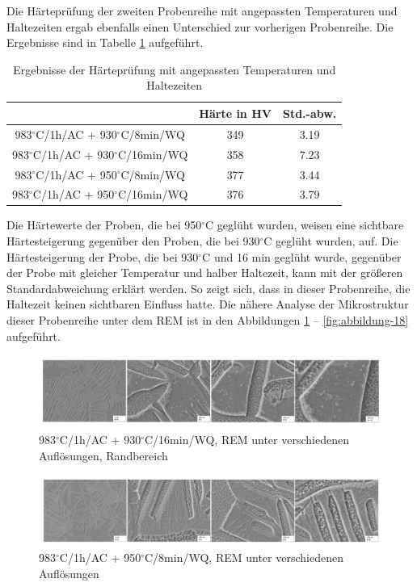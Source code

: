 Die Härteprüfung der zweiten Probenreihe mit angepassten Temperaturen und Haltezeiten ergab ebenfalls einen Unterschied zur vorherigen Probenreihe. Die Ergebnisse sind in Tabelle \ref{Tabelle 7} aufgeführt.

\begin{table}[h]
\centering
\begin{tabular}{|c|c|c|}
\hline 
& Härte in HV &  Std.-abw. \\ 
\hline 
983$^\circ$C/1h/AC + 930$^\circ$C/8min/WQ & 349 & 3.19 \\ 
\hline 
983$^\circ$C/1h/AC + 930$^\circ$C/16min/WQ & 358 & 7.23 \\ 
\hline 
983$^\circ$C/1h/AC + 950$^\circ$C/8min/WQ & 377 & 3.44 \\ 
\hline 
983$^\circ$C/1h/AC + 950$^\circ$C/16min/WQ & 376 & 3.79 \\ 
\hline 
\end{tabular} 
\caption{Ergebnisse der Härteprüfung mit angepassten Temperaturen und Haltezeiten}
\label{Tabelle 7}
\end{table}

Die Härtewerte der Proben, die bei 950$^\circ$C geglüht wurden, weisen eine sichtbare Härtesteigerung gegenüber den Proben, die bei 930$^\circ$C geglüht wurden, auf. Die Härtesteigerung der Probe, die bei 930$^\circ$C und 16 min geglüht wurde, gegenüber der Probe mit gleicher Temperatur und halber Haltezeit, kann mit der größeren Standardabweichung erklärt werden. So zeigt sich, dass in dieser Probenreihe, die Haltezeit keinen sichtbaren Einfluss hatte. Die nähere Analyse der Mikrostruktur dieser Probenreihe unter dem REM ist in den Abbildungen \ref{fig:abbildung-16} -- \ref{fig:abbildung-18} aufgeführt.

\begin{figure}[h]
	\centering
	\includegraphics[width=0.9\linewidth]{./Bilder/Abbildung 16}
	\caption[Abbildung 16]{983$^\circ$C/1h/AC + 930$^\circ$C/16min/WQ, REM unter verschiedenen Auflösungen, Randbereich}
	\label{fig:abbildung-16}
\end{figure}

\begin{figure}[!]
	\centering
	\includegraphics[width=0.9\linewidth]{./Bilder/Abbildung 17}
	\caption[Abbildung 17]{983$^\circ$C/1h/AC + 950$^\circ$C/8min/WQ, REM unter verschiedenen Auflösungen}
	\label{fig:abbildung-17}
\end{figure}

